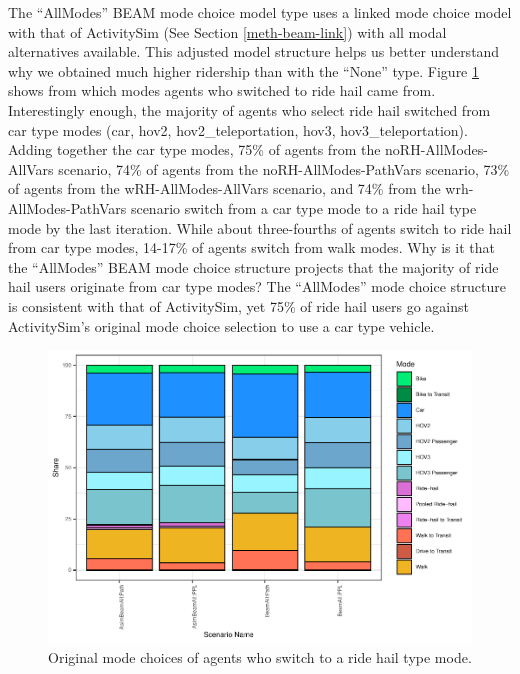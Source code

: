 \documentclass[12pt, oneside, openright]{byuthesis}
\begin{document}
The ``AllModes'' BEAM mode choice model type uses a linked mode choice model with that of ActivitySim (See Section \ref{meth-beam-link}) with all modal alternatives available. This adjusted model structure helps us better understand why we obtained much higher ridership than with the ``None'' type. Figure \ref{fig:piechart} shows from which modes agents who switched to ride hail came from. Interestingly enough, the majority of agents who select ride hail switched from car type modes (car, hov2, hov2\_teleportation, hov3, hov3\_teleportation). Adding together the car type modes, 75\% of agents from the noRH-AllModes-AllVars scenario, 74\% of agents from the noRH-AllModes-PathVars scenario, 73\% of agents from the wRH-AllModes-AllVars scenario, and 74\% from the wrh-AllModes-PathVars scenario switch from a car type mode to a ride hail type mode by the last iteration. While about three-fourths of agents switch to ride hail from car type modes, 14-17\% of agents switch from walk modes. Why is it that the ``AllModes'' BEAM mode choice structure projects that the majority of ride hail users originate from car type modes? The ``AllModes'' mode choice structure is consistent with that of ActivitySim, yet 75\% of ride hail users go against ActivitySim's original mode choice selection to use a car type vehicle.

\begin{figure}

{\centering \includegraphics{thesis_files/figure-latex/piechart-1} 

}

\caption{Original mode choices of agents who switch to a ride hail type mode.}\label{fig:piechart}
\end{figure}
\end{document}
